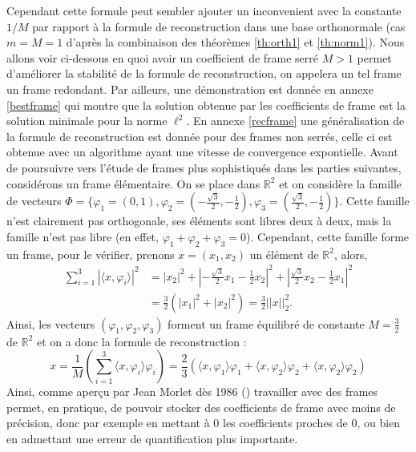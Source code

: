 Cependant cette formule peut sembler ajouter un inconvenient avec la constante $1/M$ par rapport à la formule de reconstruction dans une base orthonormale (cas $m=M=1$ d'après la combinaison des théorèmes \ref{th:orth1} et \ref{th:norm1}). 
Nous allons voir ci-dessous en quoi avoir un coefficient de frame serré $M>1$ permet d'améliorer la stabilité de la formule de reconstruction, on appelera un tel frame un frame redondant.
Par ailleurs, une démonstration est donnée en annexe \ref{bestframe} qui montre que la solution obtenue par les coefficients de frame est la solution minimale pour la norme $\ell^2$.
\newline
En annexe \ref{recframe} une généralisation de la formule de reconstruction est donnée pour des frames non serrés, celle ci est obtenue avec un algorithme ayant une vitesse de convergence expontielle.
\newline
Avant de poursuivre vers l'étude de frames plus sophistiqués dans les parties suivantes, considérons un frame élémentaire.
	On se place dans $\mathbb{R}^2$ et on considère la famille de vecteurs $\Phi= \{\varphi_1 = (0, 1), \varphi_2 = (-\frac{\sqrt{3}}{2}, -\frac{1}{2}), \varphi_3 =(\frac{\sqrt{3}}{2}, -\frac{1}{2})\}$.
	Cette famille n'est clairement pas orthogonale, ses éléments sont libres deux à deux, mais la famille n'est pas libre (en effet, $\varphi_1 +\varphi_2 +\varphi_3 = 0$).
	Cependant, cette famille forme un frame, pour le vérifier, prenons $x=(x_1, x_2)$ un élément de $\mathbb{R}^2$, alors,
	\begin{align*}
		\sum_{i=1}^3 |\langle x, \varphi_i \rangle|^2 &= |x_2|^2 + |-\frac{\sqrt{3}}{2}x_1-\frac{1}{2}x_2|^2 + |\frac{\sqrt{3}}{2}x_2 - \frac{1}{2}x_1|^2 \\
		&= \frac{3}{2}(|x_1|^2 + |x_2|^2) = \frac{3}{2} ||x||_2^2.
	\end{align*}
	Ainsi, les vecteurs $(\varphi_1, \varphi_2, \varphi_3)$ forment un frame équilibré de constante $M=\frac{3}{2}$ de $\mathbb{R}^2$ et on a donc la formule de reconstruction :
	\begin{equation}
		x = \frac{1}{M}( \sum_{i=1}^3 \langle x, \varphi_i \rangle \varphi_i) = \frac{2}{3}( \langle x, \varphi_1 \rangle \varphi_1 +  \langle x, \varphi_2 \rangle \varphi_2   + \langle x, \varphi_2 \rangle \varphi_2) 
	\end{equation}
Ainsi, comme aperçu par Jean Morlet dès 1986 (\cite{daubch3}) travailler avec des frames permet, en pratique, de pouvoir stocker des coefficients de frame avec moins de précision, donc par exemple en mettant à 0 les coefficients proches de 0, ou bien en admettant une erreur de quantification plus importante.

